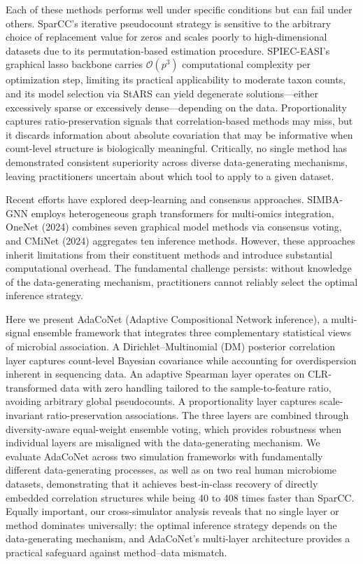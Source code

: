 \documentclass[fleqn]{nature}
\newcommand{\calO}{\mathcal{O}}
\begin{document}
Each of these methods performs well under specific conditions but can fail under others.
SparCC's iterative pseudocount strategy is sensitive to the arbitrary choice of replacement value for zeros and scales poorly to high-dimensional datasets due to its permutation-based estimation procedure\cite{watts2019}.
SPIEC-EASI's graphical lasso backbone carries $\calO(p^3)$ computational complexity per optimization step, limiting its practical applicability to moderate taxon counts, and its model selection via StARS can yield degenerate solutions---either excessively sparse or excessively dense---depending on the data\cite{liu2010}.
Proportionality captures ratio-preservation signals that correlation-based methods may miss, but it discards information about absolute covariation that may be informative when count-level structure is biologically meaningful.
Critically, no single method has demonstrated consistent superiority across diverse data-generating mechanisms, leaving practitioners uncertain about which tool to apply to a given dataset.

Recent efforts have explored deep-learning and consensus approaches.
SIMBA-GNN employs heterogeneous graph transformers for multi-omics integration, OneNet (2024) combines seven graphical model methods via consensus voting, and CMiNet (2024) aggregates ten inference methods.
However, these approaches inherit limitations from their constituent methods and introduce substantial computational overhead.
The fundamental challenge persists: without knowledge of the data-generating mechanism, practitioners cannot reliably select the optimal inference strategy.

Here we present AdaCoNet (Adaptive Compositional Network inference), a multi-signal ensemble framework that integrates three complementary statistical views of microbial association.
A Dirichlet--Multinomial (DM) posterior correlation layer captures count-level Bayesian covariance while accounting for overdispersion inherent in sequencing data.
An adaptive Spearman layer operates on CLR-transformed data with zero handling tailored to the sample-to-feature ratio, avoiding arbitrary global pseudocounts.
A proportionality layer captures scale-invariant ratio-preservation associations.
The three layers are combined through diversity-aware equal-weight ensemble voting, which provides robustness when individual layers are misaligned with the data-generating mechanism.
We evaluate AdaCoNet across two simulation frameworks with fundamentally different data-generating processes, as well as on two real human microbiome datasets, demonstrating that it achieves best-in-class recovery of directly embedded correlation structures while being 40 to 408 times faster than SparCC.
Equally important, our cross-simulator analysis reveals that no single layer or method dominates universally: the optimal inference strategy depends on the data-generating mechanism, and AdaCoNet's multi-layer architecture provides a practical safeguard against method--data mismatch.
\end{document}
